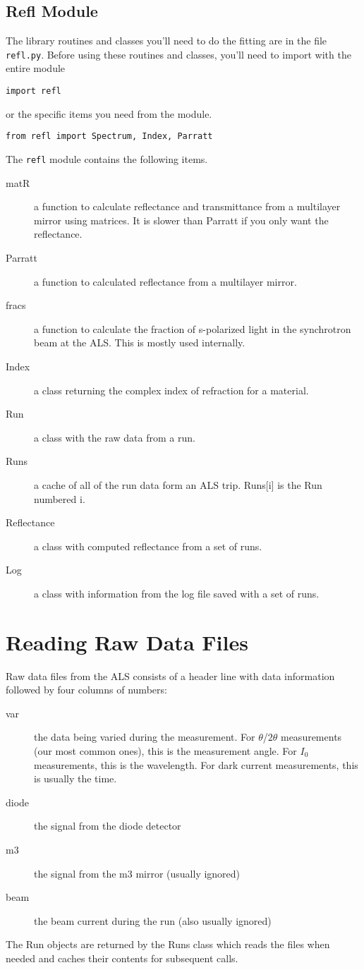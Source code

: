 \documentclass[english]{scrartcl}
\begin{document}
\subsection{Refl Module}
The library routines and classes you'll need to do the fitting
are in the file \texttt{refl.py}. Before using these routines and
classes, you'll need to import with the entire module
\begin{lstlisting}
import refl
\end{lstlisting}
or the specific items you need from the module.
\begin{lstlisting}
from refl import Spectrum, Index, Parratt
\end{lstlisting}
The \texttt{refl} module contains the following items.
\begin{description}
\item [matR] a function to calculate reflectance and transmittance
	from a multilayer mirror using matrices. It is slower than
	Parratt if you only want the reflectance.
\item [Parratt] a function to calculated reflectance from a
	multilayer mirror.
\item [fracs] a function to calculate the fraction of s-polarized
	light in the synchrotron beam at the ALS. This is mostly used
	internally.
\item [Index] a class returning the complex index of refraction
	for a material.
\item [Run] a class with the raw data from a run.
\item [Runs] a cache of all of the run data form an ALS
	trip. Runs[i] is the Run numbered i.
\item [Reflectance] a class with computed reflectance from a set
	of runs.
\item [Log] a class with information from the log file saved
	with a set of runs.
\end{description}

\section{Reading Raw Data Files}
Raw data files from the ALS consists of a header line with data
information followed by four columns of numbers:
\begin{description}
\item [var] the data being varied during the measurement. For
	$\theta$/$2\theta$ measurements (our most common ones), this
	is the measurement angle. For $I_0$ measurements, this is the
	wavelength. For dark current measurements, this is usually
	the time.
\item [diode] the signal from the diode detector
\item [m3] the signal from the m3 mirror (usually ignored)
\item [beam] the beam current during the run (also usually ignored)
\end{description}
The Run objects are returned by the Runs class which reads the files
when needed and caches their contents for subsequent calls.
\end{document}
